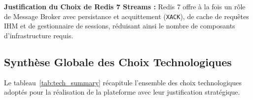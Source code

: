 \begin{table}[H]
\centering
\caption{Analyse Comparative des Syst\`emes de Message Broker}
\label{tab:comp_broker}
%
\end{table}
\par \textbf{Justification du Choix de Redis 7 Streams :} Redis 7 offre \`a la fois un r\^ole de Message Broker avec persistance et acquittement (\texttt{XACK}), de cache de requ\^etes IHM et de gestionnaire de sessions, r\'eduisant ainsi le nombre de composants d'infrastructure requis.

\subsection{Synth\`ese Globale des Choix Technologiques}
\par Le tableau~\ref{tab:tech_summary} r\'ecapitule l'ensemble des choix technologiques adopt\'es pour la r\'ealisation de la plateforme avec leur justification strat\'egique.

